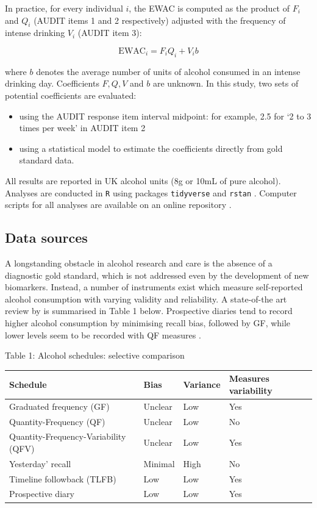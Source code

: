 \documentclass[]{article}
\providecommand{\tightlist}{%
  \setlength{\itemsep}{0pt}\setlength{\parskip}{0pt}}
\begin{document}
In practice, for every individual \(i\), the EWAC is computed as the
product of \(F_i\) and \(Q_i\) (AUDIT items 1 and 2 respectively)
adjusted with the frequency of intense drinking \(V_i\) (AUDIT item 3):

\[\text{EWAC}_i = F_i Q_i + V_ib\]

where \(b\) denotes the average number of units of alcohol consumed in
an intense drinking day. Coefficients \(F, Q, V\) and \(b\) are unknown.
In this study, two sets of potential coefficients are evaluated:

\begin{itemize}
\tightlist
\item
  using the AUDIT response item interval midpoint: for example, 2.5 for
  `2 to 3 times per week' in AUDIT item 2
\item
  using a statistical model to estimate the coefficients directly from
  gold standard data.
\end{itemize}

All results are reported in UK alcohol units (8g or 10mL of pure
alcohol). Analyses are conducted in \texttt{R} \citep{RCoreTeam2017}
using packages \texttt{tidyverse} and \texttt{rstan}
\citep{package-tidyverse, package-rstan}. Computer scripts for all
analyses are available on an online repository \citep{Dutey2020}.

\hypertarget{data-sources}{%
\subsection{Data sources}\label{data-sources}}

A longstanding obstacle in alcohol research and care is the absence of a
diagnostic gold standard, which is not addressed even by the development
of new biomarkers. Instead, a number of instruments exist which measure
self-reported alcohol consumption with varying validity and reliability.
A state-of-the art review by \citep{Greenfield2000} is summarised in
Table 1 below. Prospective diaries tend to record higher alcohol
consumption by minimising recall bias, followed by GF, while lower
levels seem to be recorded with QF measures \citep{Heeb2005, Rehm1998}.

Table 1: Alcohol schedules: selective comparison

\begin{table}[H]
\centering
\begin{tabular}{l|l|l|l}
\hline
Schedule & Bias & Variance & Measures variability\\
\hline
Graduated frequency (GF) & Unclear & Low & Yes\\
\hline
Quantity-Frequency (QF) & Unclear & Low & No\\
\hline
Quantity-Frequency-Variability (QFV) & Unclear & Low & Yes\\
\hline
Yesterday' recall & Minimal & High & No\\
\hline
Timeline followback (TLFB) & Low & Low & Yes\\
\hline
Prospective diary & Low & Low & Yes\\
\hline
\end{tabular}
\end{table}
\end{document}
